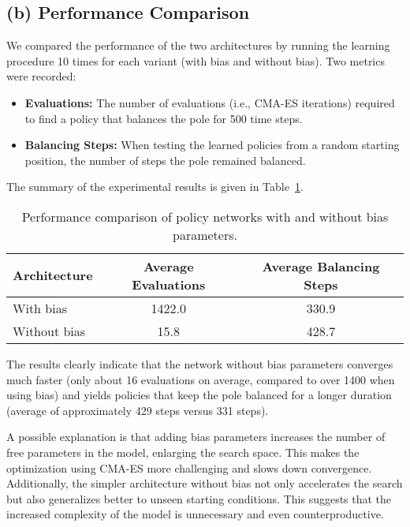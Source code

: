 \subsection*{(b) Performance Comparison}
We compared the performance of the two architectures by running the learning procedure 10 times for each variant (with bias and without bias). Two metrics were recorded:
\begin{itemize}
    \item \textbf{Evaluations:} The number of evaluations (i.e., CMA-ES iterations) required to find a policy that balances the pole for 500 time steps.
    \item \textbf{Balancing Steps:} When testing the learned policies from a random starting position, the number of steps the pole remained balanced.
\end{itemize}

The summary of the experimental results is given in Table~\ref{tab:results}.

\begin{table}[ht]
\centering
\begin{tabular}{lcc}
\toprule
Architecture & Average Evaluations & Average Balancing Steps\\
\midrule
With bias    & 1422.0              & 330.9 \\
Without bias & 15.8                & 428.7 \\
\bottomrule
\end{tabular}
\caption{Performance comparison of policy networks with and without bias parameters.}
\label{tab:results}
\end{table}

\medskip

The results clearly indicate that the network without bias parameters converges much faster (only about 16 evaluations on average,
compared to over 1400 when using bias) and yields policies that keep the pole balanced for a longer duration (average of approximately
429 steps versus 331 steps).

A possible explanation is that adding bias parameters increases the number of free parameters in the model,
enlarging the search space. This makes the optimization using CMA-ES more challenging and slows down convergence.
Additionally, the simpler architecture without bias not only accelerates the search but also generalizes better to unseen starting conditions. This suggests that the increased complexity of the model is unnecessary and even counterproductive.